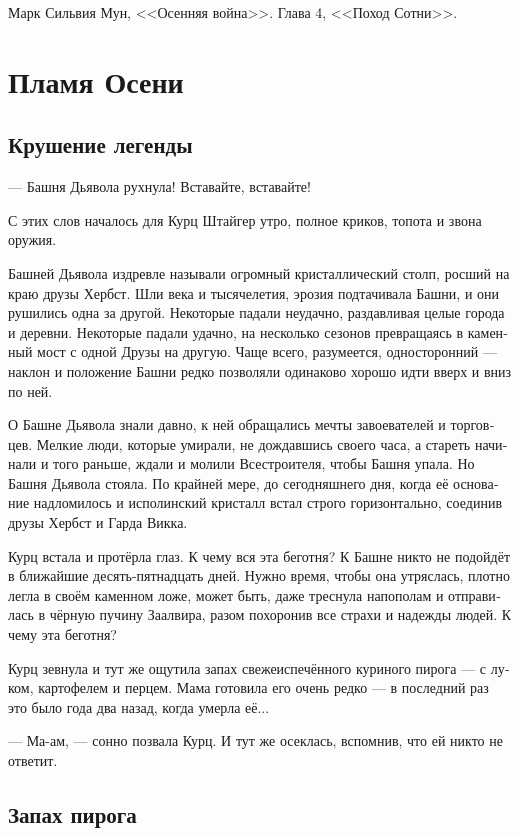 \documentclass[a4paper,12pt,fleqn]{book}\usepackage{polyglossia}\setdefaultlanguage[babelshorthands=true]{russian}\setotherlanguage{english}\defaultfontfeatures{Ligatures=TeX,Mapping=tex-text}\usepackage{xcolor}\newcommand{\ml}[3]{#2}
\begin{document}
Марк Сильвия Мун, <<Осенняя война>>.
Глава 4, <<Поход Сотни>>.


\chapter{Пламя Осени}

\section{Крушение легенды}

--- Башня Дьявола рухнула!
Вставайте, вставайте!

С этих слов началось для Курц Штайгер утро, полное криков, топота и звона оружия.

Башней Дьявола издревле называли огромный кристаллический столп, росший на краю друзы Хербст.
Шли века и тысячелетия, эрозия подтачивала Башни, и они рушились одна за другой.
Некоторые падали неудачно, раздавливая целые города и деревни.
Некоторые падали удачно, на несколько сезонов превращаясь в каменный мост с одной Друзы на другую.
Чаще всего, разумеется, односторонний --- наклон и положение Башни редко позволяли одинаково хорошо идти вверх и вниз по ней.

О Башне Дьявола знали давно, к ней обращались мечты завоевателей и торговцев.
Мелкие люди, которые умирали, не дождавшись своего часа, а стареть начинали и того раньше, ждали и молили Всестроителя, чтобы Башня упала.
Но Башня Дьявола стояла.
По крайней мере, до сегодняшнего дня, когда её основание надломилось и исполинский кристалл встал строго горизонтально, соединив друзы Хербст и Гарда Викка.

Курц встала и протёрла глаз.
К чему вся эта беготня?
К Башне никто не подойдёт в ближайшие десять-пятнадцать дней.
Нужно время, чтобы она утряслась, плотно легла в своём каменном ложе, может быть, даже треснула напополам и отправилась в чёрную пучину Заалвира, разом похоронив все страхи и надежды людей.
К чему эта беготня?

Курц зевнула и тут же ощутила запах свежеиспечённого куриного пирога --- с луком, картофелем и перцем.
Мама готовила его очень редко --- в последний раз это было года два назад, когда умерла её...

--- Ма-ам, --- сонно позвала Курц.
И тут же осеклась, вспомнив, что ей никто не ответит.

\section{Запах пирога}
\end{document}
